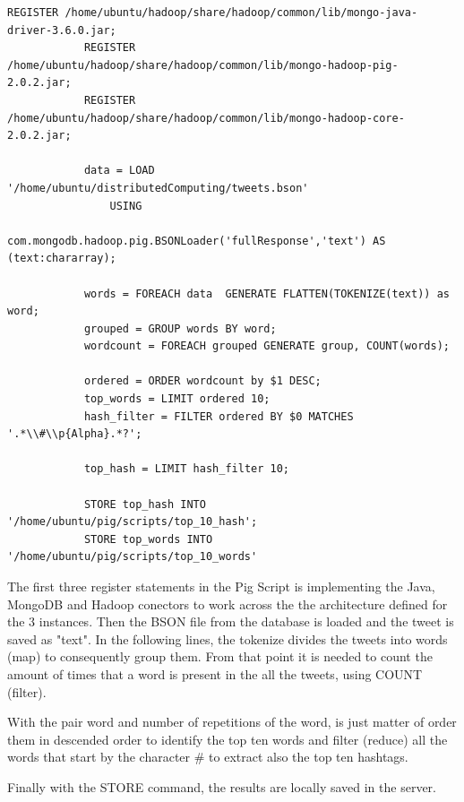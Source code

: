 \documentclass{article}
\begin{document}
        \begin{lstlisting}[language=Pig, caption= Tweet cleaning function, label={lst:dataCleaning}]
            REGISTER /home/ubuntu/hadoop/share/hadoop/common/lib/mongo-java-driver-3.6.0.jar;
            REGISTER /home/ubuntu/hadoop/share/hadoop/common/lib/mongo-hadoop-pig-2.0.2.jar;
            REGISTER /home/ubuntu/hadoop/share/hadoop/common/lib/mongo-hadoop-core-2.0.2.jar;
            
            data = LOAD '/home/ubuntu/distributedComputing/tweets.bson'
                USING
                com.mongodb.hadoop.pig.BSONLoader('fullResponse','text') AS (text:chararray);
            
            words = FOREACH data  GENERATE FLATTEN(TOKENIZE(text)) as word;
            grouped = GROUP words BY word;
            wordcount = FOREACH grouped GENERATE group, COUNT(words);
            
            ordered = ORDER wordcount by $1 DESC;
            top_words = LIMIT ordered 10;
            hash_filter = FILTER ordered BY $0 MATCHES '.*\\#\\p{Alpha}.*?';
            
            top_hash = LIMIT hash_filter 10;

            STORE top_hash INTO '/home/ubuntu/pig/scripts/top_10_hash';
            STORE top_words INTO '/home/ubuntu/pig/scripts/top_10_words'

        \end{lstlisting}

        The first three register statements in the Pig Script is implementing the Java, MongoDB and Hadoop conectors to work across the the architecture defined for the 3 instances. Then
        the BSON file from the database is loaded and the tweet is saved as "text". In the following lines, the tokenize divides the tweets into words (map) to consequently group them.
        From that point it is needed to count the amount of times that a word is present in the all the tweets, using COUNT (filter).
        
        With the pair word and number of repetitions of the word, is just matter of order them in descended order to identify the top ten words and filter (reduce) all the words that start by the character \# to 
        extract also the top ten hashtags.

        Finally with the STORE command, the results are locally saved in the server.
\end{document}
